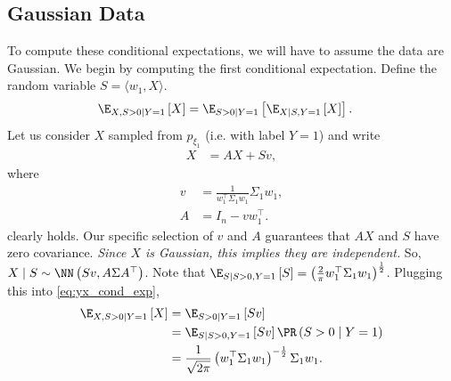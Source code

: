 \documentclass{article}
\begin{document}
\subsection*{Gaussian Data}
To compute these conditional expectations, we will have to assume the data are Gaussian.
We begin by computing the first conditional expectation.
Define the random variable $S = \langle w_1, X \rangle$.
\begin{align} \label{eq:yx_cond_exp}
  \E_{X, S > 0 \mid Y=1} \left[ X \right]
  &= \E_{S > 0 \mid Y=1} \left[ \E_{X \mid S, Y=1} \left[ X \right] \right].
\end{align}
Let us consider $X$ sampled from $p_{\xi_1}$ (i.e. with label $Y=1$) and write
\begin{align}
  X &= AX + S v, \label{eq:X_rewrite}
\end{align}
where
\begin{align}
  v &= \frac{1}{ w_1^\top \Sigma_1 w_1 } \Sigma_1 w_1, \\
  A &= I_n - v w_1^\top.
\end{align}
 clearly holds.
Our specific selection of $v$ and $A$ guarantees that $A X$ and $S$ have zero covariance.
\emph{Since $X$ is Gaussian, this implies they are independent.}
So, $X \mid S \sim \NN\left( S v, A \Sigma A^\top \right)$.
Note that $\E_{S \mid S>0, Y=1} \left[ S \right] = \left( \frac{2}{\pi} w_1^\top \Sigma_1 w_1 \right)^{\frac{1}{2}}$.
Plugging this into \cref{eq:yx_cond_exp},
\begin{align}
  \E_{X, S > 0 \mid Y=1} \left[ X \right]
  &= \E_{S>0 \mid Y=1} \left[ S v \right] \\
  &= \E_{S \mid S>0, Y=1} \left[ S v \right] \PR\left( S > 0 \mid Y = 1  \right) \\
  &= \frac{1}{\sqrt{2 \pi}} \left( w_1^\top \Sigma_1 w_1 \right)^{-\frac{1}{2}} \Sigma_1 w_1.
\end{align}
\end{document}
